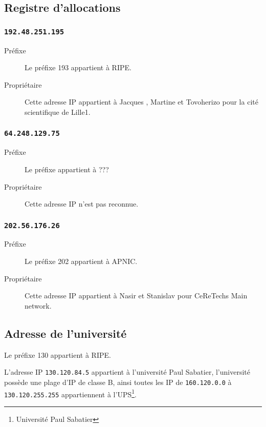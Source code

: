 \documentclass[a4paper, 11pt]{article}
\begin{document}
	\subsection{Registre d'allocations}
	\subsubsection{\texttt{192.48.251.195}}
		\begin{description}
			\item[Préfixe] Le préfixe 193 appartient à RIPE.
			\item[Propriétaire] Cette adresse IP appartient à Jacques , Martine  et Tovoherizo  pour la cité scientifique de Lille1.
		\end{description}

	
		\subsubsection{\texttt{64.248.129.75}}
		\begin{description}
			\item[Préfixe] Le préfixe appartient à ??? 
			\item[Propriétaire] Cette adresse IP n'est pas reconnue.
		\end{description}

		\subsubsection{\texttt{202.56.176.26}}
		\begin{description}
			\item[Préfixe] Le préfixe 202 appartient à APNIC.
			\item[Propriétaire] Cette adresse IP appartient à Nasir  et Stanislav  pour CeReTechs Main network. 
		\end{description}
		
		\subsection{Adresse de l'université}
		Le préfixe 130 appartient à RIPE.

		L'adresse IP \texttt{130.120.84.5} appartient à l'université Paul Sabatier, l'université possède une plage d'IP de classe B, ainsi toutes les IP
		de \texttt{160.120.0.0} à \texttt{130.120.255.255} appartiennent à l'UPS\footnote{Université Paul Sabatier}.
\end{document}
